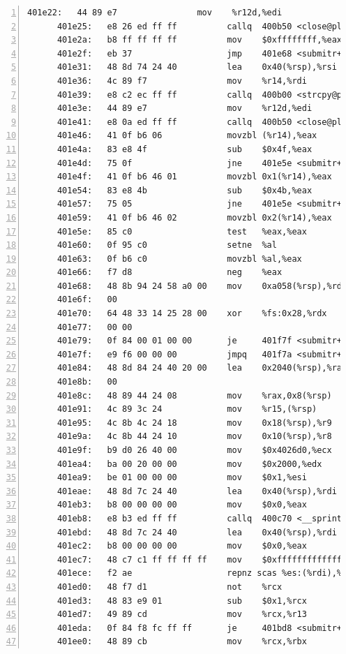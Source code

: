 \documentclass{article}
\begin{document}
\begin{lstlisting}[title = bomb的反汇编代码及部分注释, xleftmargin = 2em,xrightmargin = 2em, aboveskip = 1em, numbers = left, basicstyle=\scriptsize\ttfamily, numberstyle=\scriptsize]
      401e22:	44 89 e7             	mov    %r12d,%edi
      401e25:	e8 26 ed ff ff       	callq  400b50 <close@plt>
      401e2a:	b8 ff ff ff ff       	mov    $0xffffffff,%eax
      401e2f:	eb 37                	jmp    401e68 <submitr+0x6bc>
      401e31:	48 8d 74 24 40       	lea    0x40(%rsp),%rsi
      401e36:	4c 89 f7             	mov    %r14,%rdi
      401e39:	e8 c2 ec ff ff       	callq  400b00 <strcpy@plt>
      401e3e:	44 89 e7             	mov    %r12d,%edi
      401e41:	e8 0a ed ff ff       	callq  400b50 <close@plt>
      401e46:	41 0f b6 06          	movzbl (%r14),%eax
      401e4a:	83 e8 4f             	sub    $0x4f,%eax
      401e4d:	75 0f                	jne    401e5e <submitr+0x6b2>
      401e4f:	41 0f b6 46 01       	movzbl 0x1(%r14),%eax
      401e54:	83 e8 4b             	sub    $0x4b,%eax
      401e57:	75 05                	jne    401e5e <submitr+0x6b2>
      401e59:	41 0f b6 46 02       	movzbl 0x2(%r14),%eax
      401e5e:	85 c0                	test   %eax,%eax
      401e60:	0f 95 c0             	setne  %al
      401e63:	0f b6 c0             	movzbl %al,%eax
      401e66:	f7 d8                	neg    %eax
      401e68:	48 8b 94 24 58 a0 00 	mov    0xa058(%rsp),%rdx
      401e6f:	00 
      401e70:	64 48 33 14 25 28 00 	xor    %fs:0x28,%rdx
      401e77:	00 00 
      401e79:	0f 84 00 01 00 00    	je     401f7f <submitr+0x7d3>
      401e7f:	e9 f6 00 00 00       	jmpq   401f7a <submitr+0x7ce>
      401e84:	48 8d 84 24 40 20 00 	lea    0x2040(%rsp),%rax
      401e8b:	00 
      401e8c:	48 89 44 24 08       	mov    %rax,0x8(%rsp)
      401e91:	4c 89 3c 24          	mov    %r15,(%rsp)
      401e95:	4c 8b 4c 24 18       	mov    0x18(%rsp),%r9
      401e9a:	4c 8b 44 24 10       	mov    0x10(%rsp),%r8
      401e9f:	b9 d0 26 40 00       	mov    $0x4026d0,%ecx
      401ea4:	ba 00 20 00 00       	mov    $0x2000,%edx
      401ea9:	be 01 00 00 00       	mov    $0x1,%esi
      401eae:	48 8d 7c 24 40       	lea    0x40(%rsp),%rdi
      401eb3:	b8 00 00 00 00       	mov    $0x0,%eax
      401eb8:	e8 b3 ed ff ff       	callq  400c70 <__sprintf_chk@plt>
      401ebd:	48 8d 7c 24 40       	lea    0x40(%rsp),%rdi
      401ec2:	b8 00 00 00 00       	mov    $0x0,%eax
      401ec7:	48 c7 c1 ff ff ff ff 	mov    $0xffffffffffffffff,%rcx
      401ece:	f2 ae                	repnz scas %es:(%rdi),%al
      401ed0:	48 f7 d1             	not    %rcx
      401ed3:	48 83 e9 01          	sub    $0x1,%rcx
      401ed7:	49 89 cd             	mov    %rcx,%r13
      401eda:	0f 84 f8 fc ff ff    	je     401bd8 <submitr+0x42c>
      401ee0:	48 89 cb             	mov    %rcx,%rbx

\end{lstlisting}
\end{document}
